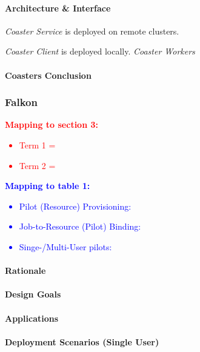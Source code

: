 \documentclass{sig-alternate}
\begin{document}
\paragraph{Architecture \& Interface}

\textit{Coaster Service} is deployed on remote clusters.

\textit{Coaster Client} is deployed locally.
\textit{Coaster Workers}


\paragraph{Coasters Conclusion}


\subsubsection{Falkon}

\textcolor{red}
{
\textbf{Mapping to section 3:}
\begin{itemize}
\item Term 1 =
\item Term 2 =
\end{itemize}
}

\textcolor{blue}
{
\textbf{Mapping to table 1:}
\begin{itemize}
\item Pilot (Resource) Provisioning:
\item Job-to-Resource (Pilot) Binding:
\item Singe-/Multi-User pilots:
\end{itemize}
}


\paragraph{Rationale}


\paragraph{Design Goals}


\paragraph{Applications}


\paragraph{Deployment Scenarios (Single User)}
\end{document}
